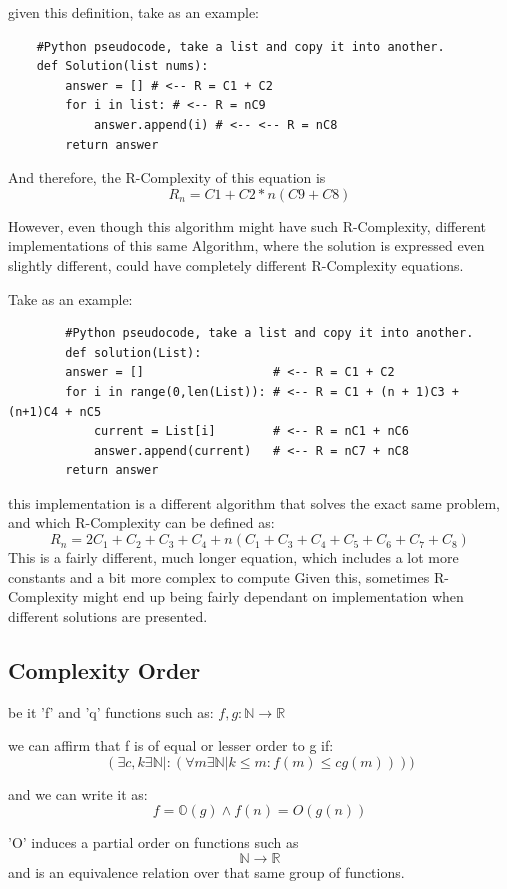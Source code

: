 \documentclass[12pt,a4paper,olive]{bbe}
\begin{document}
	given this definition, take as an example: 
	\bigskip
	\bigskip

	\begin{verbatim}
	#Python pseudocode, take a list and copy it into another.
	def Solution(list nums): 
	    answer = [] # <-- R = C1 + C2
	    for i in list: # <-- R = nC9
	        answer.append(i) # <-- <-- R = nC8 
	    return answer
	\end{verbatim}

	And therefore, the R-Complexity of this equation is $$R_n=C1+C2*n(C9+C8)$$ 

	However, even though this algorithm might have such R-Complexity, different implementations of this 
	same Algorithm, where the solution is expressed even slightly different, could have completely different
	R-Complexity equations.

	Take as an example:
	\begin{verbatim}
		#Python pseudocode, take a list and copy it into another.
		def solution(List): 
		answer = [] 				 # <-- R = C1 + C2
		for i in range(0,len(List)): # <-- R = C1 + (n + 1)C3 + (n+1)C4 + nC5
		    current = List[i]		 # <-- R = nC1 + nC6
		    answer.append(current)   # <-- R = nC7 + nC8
		return answer
	\end{verbatim}

	this implementation is a different algorithm that solves the exact same problem, and which R-Complexity can be
	defined as:
	$$ R_n = 2C_1 + C_2 + C_3 + C_4 + n(C_1 + C_3 + C_4 + C_5 + C_6+ C_7+ C_8) $$
	This is a fairly different, much longer equation, which includes a lot more constants and a bit more complex to compute
	Given this, sometimes R-Complexity might end up being fairly dependant on implementation when different solutions are presented.
	\subsection{Complexity Order}
	be it 'f' and 'q' functions such as: $f,g : \mathbb{N} \rightarrow \mathbb{R}$

	we can affirm that f is of equal or lesser order to g if:
	$$ ( \exists c, k \exists \mathbb{N} |: (\forall m \exists \mathbb{N} | k \le m : f(m) \le cg(m) ) ))$$

	and we can write it as: 
	$$f = \mathbb{O}(g) \land f(n) = O(g(n))$$
	
	'O' induces a partial order on functions such as $$\mathbb{N} \rightarrow \mathbb{R}$$ and 
	is an equivalence relation over that same group of functions. 
\end{document}
